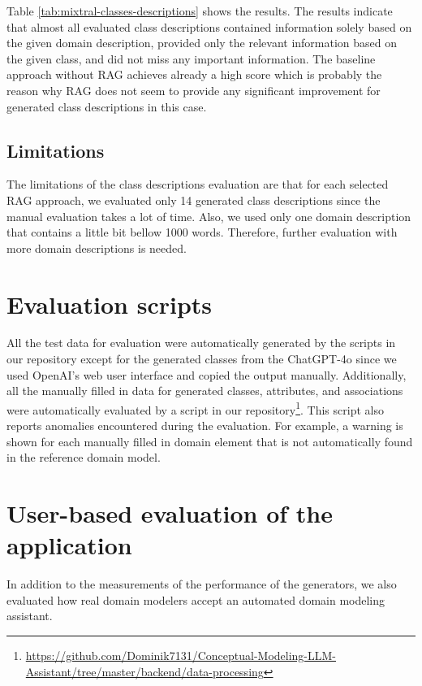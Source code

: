 Table \ref{tab:mixtral-classes-descriptions} shows the results. The results indicate that almost all evaluated class descriptions contained information solely based on the given domain description, provided only the relevant information based on the given class, and did not miss any important information. The baseline approach without RAG achieves already a high score which is probably the reason why RAG does not seem to provide any significant improvement for generated class descriptions in this case.


\subsection{Limitations}

The limitations of the class descriptions evaluation are that for each selected RAG approach, we evaluated only 14 generated class descriptions since the manual evaluation takes a lot of time. Also, we used only one domain description that contains a little bit bellow 1000 words. Therefore, further evaluation with more domain descriptions is needed.


\section{Evaluation scripts}

All the test data for evaluation were automatically generated by the scripts in our repository except for the generated classes from the ChatGPT-4o since we used OpenAI's web user interface and copied the output manually. Additionally, all the manually filled in data for generated classes, attributes, and associations were automatically evaluated by a script in our repository\footnote{\url{https://github.com/Dominik7131/Conceptual-Modeling-LLM-Assistant/tree/master/backend/data-processing}}. This script also reports anomalies encountered during the evaluation. For example, a warning is shown for each manually filled in domain element that is not automatically found in the reference domain model.


\section{User-based evaluation of the application}

In addition to the measurements of the performance of the generators, we also evaluated how real domain modelers accept an automated domain modeling assistant. 

